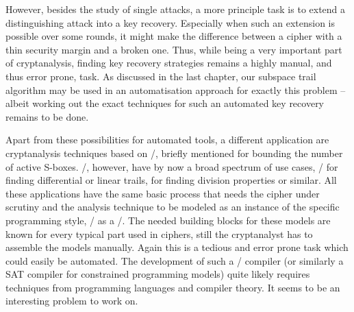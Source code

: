 However, besides the study of single attacks, a more principle task is to extend a distinguishing attack into a key recovery.
Especially when such an extension is possible over some rounds, it might make the difference between a cipher with a thin security margin and a broken one.
Thus, while being a very important part of cryptanalysis, finding key recovery strategies remains a highly manual, and thus error prone, task.
As discussed in the last chapter, our subspace trail algorithm may be used in an automatisation approach for exactly this problem -- albeit working out the exact techniques for such an automated key recovery remains to be done.

Apart from these possibilities for automated tools, a different application are cryptanalysis techniques based on \MILPp/, briefly mentioned for bounding the number of active S-boxes.
\MILPp/, however, have by now a broad spectrum of use cases, \eg/ for finding differential or linear trails, for finding division properties or similar.
All these applications have the same basic process that needs the cipher under scrutiny and the analysis technique to be modeled as an instance of the specific programming style, \ie/ as a \MILP/.
The needed building blocks for these models are known for every typical part used in ciphers, still the cryptanalyst has to assemble the models manually.
Again this is a tedious and error prone task which could easily be automated.
The development of such a \MILP/ compiler (or similarly a SAT compiler for constrained programming models) quite likely requires techniques from programming languages and compiler theory.
It seems to be an interesting problem to work on.

